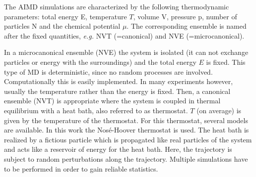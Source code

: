 \documentclass[11pt,DIV=13,BCOR=5mm,a4paper,headinclude]{scrbook}
\begin{document}
The AIMD simulations are characterized by the following thermodynamic parameters: total energy E, temperature $T$, volume V, pressure p, number of particles N and the chemical potential $\mu$.
The corresponding ensemble is named after the fixed quantities, \textit{e.g.} NVT (=canonical) and NVE (=microcanonical).


In a microcanonical ensemble (NVE) the system is isolated (it can not exchange particles or energy with the surroundings) and the total energy $E$ is fixed.
This type of MD is deterministic, since no random processes are involved.
Computationally this is easily implemented.
In many experiments however, usually the temperature rather than the energy is fixed.
Then, a canonical ensemble (NVT) is appropriate where the system is coupled in thermal equilibrium with a heat bath, also referred to as thermostat.
$T$ (on average) is given by the temperature of the thermostat.
For this thermostat, several models are available.
In this work the Nos\'{e}-Hoover thermostat\cite{nose1984,nose1984_2,hoover1985} is used.
The heat bath is realized by a fictious particle which is propagated like real particles of the system and acts like a reservoir of energy for the heat bath.
Here, the trajectory is subject to random perturbations along the trajectory.
Multiple simulations have to be performed in order to gain reliable statistics.
\end{document}
